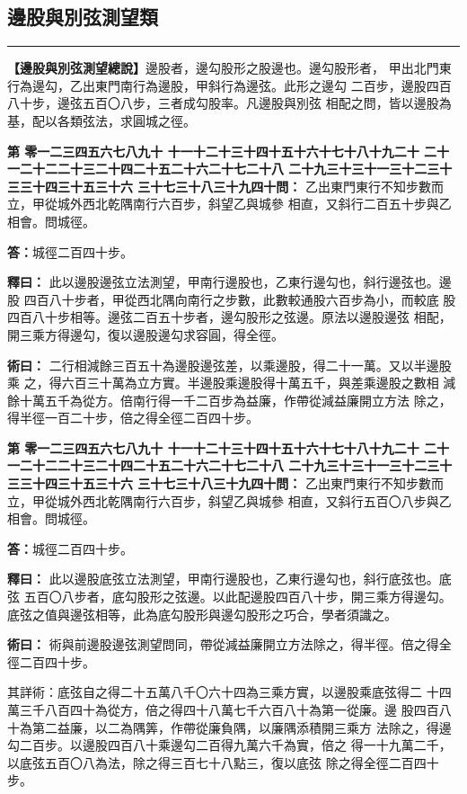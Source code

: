 \documentclass[11pt,a4paper]{article}
\newcommand{\longline}{\noindent\rule{\textwidth}{0.4pt}}
\newcounter{probnum}
\newcommand{\chnum}[1]{%
  \ifcase#1 零\or 一\or 二\or 三\or 四\or 五\or 六\or 七\or 八\or 九\or 十\or
    十一\or 十二\or 十三\or 十四\or 十五\or 十六\or 十七\or 十八\or 十九\or 二十\or
    二十一\or 二十二\or 二十三\or 二十四\or 二十五\or 二十六\or 二十七\or 二十八\or
    二十九\or 三十\or 三十一\or 三十二\or 三十三\or 三十四\or 三十五\or 三十六\or
    三十七\or 三十八\or 三十九\or 四十\fi}
\newcommand{\problem}[1]{\stepcounter{probnum}\par\noindent\textbf{第\chnum{\value{probnum}}問：}#1\par}
\newcommand{\answer}[1]{\par\noindent\textbf{答：}#1\par}
\newcommand{\shiyi}[1]{\par\noindent\textbf{釋曰：}#1\par}
\newcommand{\shuyue}[1]{\par\noindent\textbf{術曰：}#1\par}
\begin{document}
\subsection*{邊股與別弦測望類}
\vspace{0.3cm}
\longline
\vspace{0.3cm}

\noindent
\textbf{【邊股與別弦測望總說】}邊股者，邊勾股形之股邊也。邊勾股形者，
甲出北門東行為邊勾，乙出東門南行為邊股，甲斜行為邊弦。此形之邊勾
二百步，邊股四百八十步，邊弦五百〇八步，三者成勾股率。凡邊股與別弦
相配之問，皆以邊股為基，配以各類弦法，求圓城之徑。

\problem{
乙出東門東行不知步數而立，甲從城外西北乾隅南行六百步，斜望乙與城參
相直，又斜行二百五十步與乙相會。問城徑。
}

\answer{城徑二百四十步。}

\shiyi{
此以邊股邊弦立法測望，甲南行邊股也，乙東行邊勾也，斜行邊弦也。邊股
四百八十步者，甲從西北隅向南行之步數，此數較通股六百步為小，而較底
股四百八十步相等。邊弦二百五十步者，邊勾股形之弦邊。原法以邊股邊弦
相配，開三乘方得邊勾，復以邊股邊勾求容圓，得全徑。
}

\shuyue{
二行相減餘三百五十為邊股邊弦差，以乘邊股，得二十一萬。又以半邊股乘
之，得六百三十萬為立方實。半邊股乘邊股得十萬五千，與差乘邊股之數相
減餘十萬五千為從方。倍南行得一千二百步為益廉，作帶從減益廉開立方法
除之，得半徑一百二十步，倍之得全徑二百四十步。
}

\vspace{0.3cm}
\problem{
乙出東門東行不知步數而立，甲從城外西北乾隅南行六百步，斜望乙與城參
相直，又斜行五百〇八步與乙相會。問城徑。
}

\answer{城徑二百四十步。}

\shiyi{
此以邊股底弦立法測望，甲南行邊股也，乙東行邊勾也，斜行底弦也。底弦
五百〇八步者，底勾股形之弦邊。以此配邊股四百八十步，開三乘方得邊勾。
底弦之值與邊弦相等，此為底勾股形與邊勾股形之巧合，學者須識之。
}

\shuyue{
術與前邊股邊弦測望問同，帶從減益廉開立方法除之，得半徑。倍之得全
徑二百四十步。

其詳術：底弦自之得二十五萬八千〇六十四為三乘方實，以邊股乘底弦得二
十四萬三千八百四十為從方，倍之得四十八萬七千六百八十為第一從廉。邊
股四百八十為第二益廉，以二為隅筭，作帶從廉負隅，以廉隅添積開三乘方
法除之，得邊勾二百步。以邊股四百八十乘邊勾二百得九萬六千為實，倍之
得一十九萬二千，以底弦五百〇八為法，除之得三百七十八點三，復以底弦
除之得全徑二百四十步。
}
\end{document}
